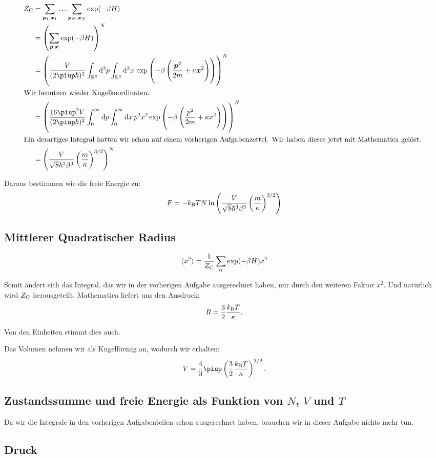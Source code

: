 \begin{align*}
    Z_\text C
    &= \sum_{\vec p_1, \vec x_1} \ldots \sum_{\vec p_N, \vec x_N} \exp(-\beta
    H) \\
    &= \del{\sum_{\vec p, \vec x} \exp(-\beta H)}^N \\
    &= \del{\frac{V}{(2\piup\hbar)^2} \int_{\R^3} \dif{^3 p} \int_{\R^3}
    \dif{^3 x} \, \exp\del{-\beta
\del{\frac{\vec p^2}{2m} + \kappa \vec x^2}}}^N \\
\intertext{%
Wir benutzen wieder Kugelkoordinaten.
}
    &= \del{\frac{16 \piup^2 V}{(2\piup\hbar)^2} \int_0^\infty \dif p
\int_0^\infty \dif x \, p^2 x^2 \exp\del{-\beta
\del{\frac{p^2}{2m} + \kappa x^2}}}^N \\
\intertext{%
    Ein derartiges Integral hatten wir schon auf einem vorherigen
    Aufgabenzettel. Wir haben dieses jetzt mit Mathematica gelöst.
}
&= \del{\frac{V}{\sqrt 8 \hbar^3 \beta^3} \del{\frac m \kappa}^{3/2}}^N
\end{align*}

Daraus bestimmen wie die freie Energie zu:
\[
    F = - \kB T N \ln\del{\frac{V}{\sqrt 8 \hbar^3 \beta^3} \del{\frac m \kappa}^{3/2}}
\]

\subsection{Mittlerer Quadratischer Radius}

\[
    \langle x^2 \rangle = \frac{1}{Z_\text C} \sum_\alpha \exp(- \beta H) x^2
\]

Somit ändert sich das Integral, das wir in der vorherigen Aufgabe ausgerechnet
haben, nur durch den weiteren Faktor $x^2$. Und natürlich wird $Z_\text C$
herausgeteilt. Mathematica liefert uns den Ausdruck:
\[
    R = \frac 32 \frac{k_\text B T}{\kappa}.
\]

Von den Einheiten stimmt dies auch.

Das Volumen nehmen wir als Kugelförmig an, wodurch wir erhalten:
\[
    V = \frac 43 \piup \del{\frac 32 \frac{\kB T}\kappa}^{3/2}.
\]

\subsection{Zustandssumme und freie Energie als Funktion von $N$, $V$ und $T$}

Da wir die Integrale in den vorherigen Aufgabenteilen schon ausgerechnet haben,
brauchen wir in dieser Aufgabe nichts mehr tun.

\subsection{Druck}

